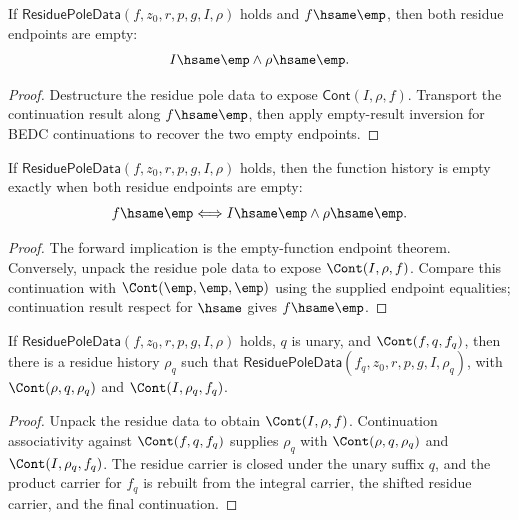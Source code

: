 \begin{theorem}
\label{thm:residue-pole-data-empty-function-endpoints}
If $\mathsf{ResiduePoleData}(f,z_0,r,p,g,I,\rho)$ holds and
$f \hsame \emp$, then both residue endpoints are empty:
$$
I \hsame \emp \land \rho \hsame \emp.
$$
\end{theorem}
\begin{proof}
Destructure the residue pole data to expose $\mathsf{Cont}(I,\rho,f)$.
Transport the continuation result along $f \hsame \emp$, then apply empty-result
inversion for BEDC continuations to recover the two empty endpoints.
\end{proof}

\begin{theorem}
\label{thm:residue-pole-data-empty-function-endpoints-iff}
If $\mathsf{ResiduePoleData}(f,z_0,r,p,g,I,\rho)$ holds, then the function
history is empty exactly when both residue endpoints are empty:
$$
f \hsame \emp \Longleftrightarrow I \hsame \emp \land \rho \hsame \emp.
$$
\end{theorem}
\begin{proof}
The forward implication is the empty-function endpoint theorem. Conversely,
unpack the residue pole data to expose $\Cont(I,\rho,f)$. Compare this
continuation with $\Cont(\emp,\emp,\emp)$ using the supplied endpoint
equalities; continuation result respect for $\hsame$ gives $f\hsame\emp$.
\end{proof}

\begin{theorem}
\label{thm:residue-pole-data-residue-suffix-closure}
If \(\mathsf{ResiduePoleData}(f,z_0,r,p,g,I,\rho)\) holds, \(q\) is unary,
and \(\Cont(f,q,f_q)\), then there is a residue history \(\rho_q\) such that
\(\mathsf{ResiduePoleData}(f_q,z_0,r,p,g,I,\rho_q)\), with
\(\Cont(\rho,q,\rho_q)\) and \(\Cont(I,\rho_q,f_q)\).
\end{theorem}
\begin{proof}
Unpack the residue data to obtain \(\Cont(I,\rho,f)\). Continuation
associativity against \(\Cont(f,q,f_q)\) supplies \(\rho_q\) with
\(\Cont(\rho,q,\rho_q)\) and \(\Cont(I,\rho_q,f_q)\). The residue carrier is
closed under the unary suffix \(q\), and the product carrier for \(f_q\) is
rebuilt from the integral carrier, the shifted residue carrier, and the final
continuation.
\end{proof}

